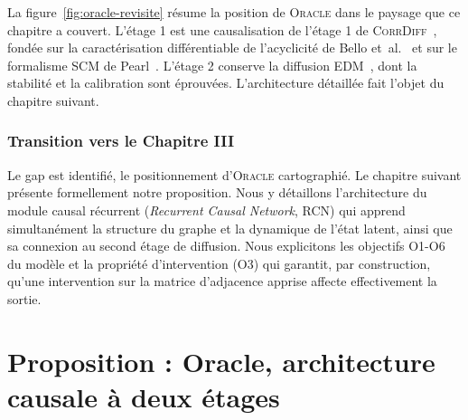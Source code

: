 \documentclass[14pt,a4paper,openany]{extreport}
\theoremstyle{definition}
\newcommand{\Oracle}{\textsc{Oracle}}
\newcommand{\CorrDiff}{\textsc{CorrDiff}}
\begin{document}
La figure~\ref{fig:oracle-revisite} résume la position de \Oracle{} dans le paysage que ce chapitre a couvert. L'étage 1 est une causalisation de l'étage 1 de \CorrDiff{}~\cite{mardani_corrdiff_2023}, fondée sur la caractérisation différentiable de l'acyclicité de Bello et~al.~\cite{bello_dagma_2022} et sur le formalisme SCM de Pearl~\cite{pearl_causality_2009}. L'étage 2 conserve la diffusion EDM~\cite{karras_edm_2022}, dont la stabilité et la calibration sont éprouvées. L'architecture détaillée fait l'objet du chapitre suivant.

\subsection{Transition vers le Chapitre III}
\label{ssec:soa-transition}

Le gap est identifié, le positionnement d'\Oracle{} cartographié. Le chapitre suivant présente formellement notre proposition. Nous y détaillons l'architecture du module causal récurrent (\emph{Recurrent Causal Network}, RCN) qui apprend simultanément la structure du graphe et la dynamique de l'état latent, ainsi que sa connexion au second étage de diffusion. Nous explicitons les objectifs O1-O6 du modèle et la propriété d'intervention (O3) qui garantit, par construction, qu'une intervention sur la matrice d'adjacence apprise affecte effectivement la sortie.


\chapter{Proposition : Oracle, architecture causale à deux étages}
\label{chap:oracle}
\end{document}
